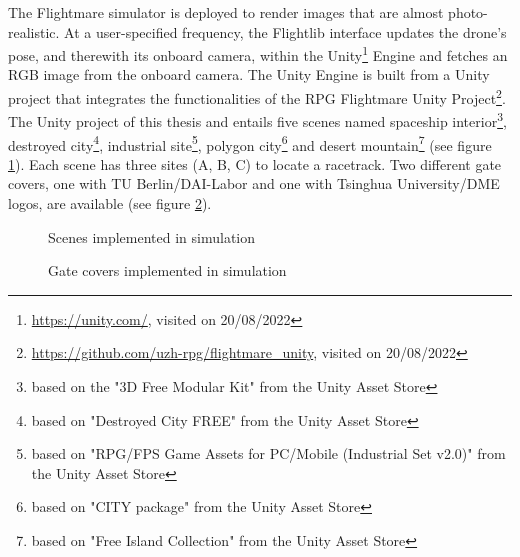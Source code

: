 The Flightmare \cite{Song2020} simulator is deployed to render 
images that are almost photo-realistic.
At a user-specified frequency,
the Flightlib interface
updates the drone's pose, and therewith its onboard camera,
within the Unity\footnote{
    \url{https://unity.com/}, visited on 20/08/2022
} Engine and fetches an RGB image from the onboard camera.
The Unity Engine is built from a Unity project
that integrates the functionalities of the RPG Flightmare Unity Project\footnote{
    \url{https://github.com/uzh-rpg/flightmare_unity}, visited on 20/08/2022
}.
The Unity project of this thesis 
and entails five scenes named
spaceship interior\footnote{
    based on the "3D Free Modular Kit" from the Unity Asset Store
},
destroyed city\footnote{
    based on "Destroyed City FREE" from the Unity Asset Store
},
industrial site\footnote{
    based on "RPG/FPS Game Assets for PC/Mobile (Industrial Set v2.0)" from the Unity Asset Store
},
polygon city\footnote{
    based on "CITY package" from the Unity Asset Store
}
and desert mountain\footnote{
    based on "Free Island Collection" from the Unity Asset Store
}
(see figure \ref{fig:unity_scenes}).
Each scene has three sites (A, B, C) to locate a racetrack.
Two different gate covers, 
one with TU Berlin/DAI-Labor and one with Tsinghua University/DME logos, 
are available (see figure \ref{fig:unity_gates}).
\begin{figure}[h]
    \centering
    \par
    \caption[
        Scenes implemented in simulation
    ]{
        Scenes implemented in simulation
        \label{fig:unity_scenes}
    }
\end{figure}
\begin{figure}[h]
    \centering
    \caption[
        Gate covers implemented in simulation
    ]{
        Gate covers implemented in simulation
        \label{fig:unity_gates}
    }
\end{figure}


